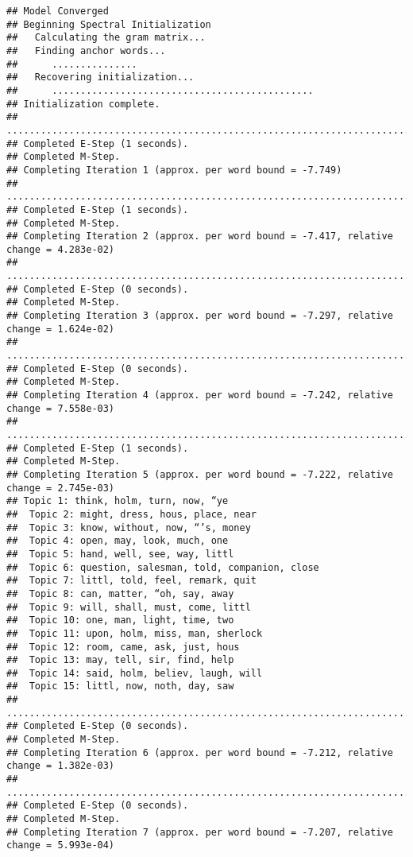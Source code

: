 \documentclass[
]{book}
\begin{document}
\begin{verbatim}
## Model Converged 
## Beginning Spectral Initialization 
##   Calculating the gram matrix...
##   Finding anchor words...
##      ...............
##   Recovering initialization...
##      ..............................................
## Initialization complete.
## ....................................................................................................
## Completed E-Step (1 seconds). 
## Completed M-Step. 
## Completing Iteration 1 (approx. per word bound = -7.749) 
## ....................................................................................................
## Completed E-Step (1 seconds). 
## Completed M-Step. 
## Completing Iteration 2 (approx. per word bound = -7.417, relative change = 4.283e-02) 
## ....................................................................................................
## Completed E-Step (0 seconds). 
## Completed M-Step. 
## Completing Iteration 3 (approx. per word bound = -7.297, relative change = 1.624e-02) 
## ....................................................................................................
## Completed E-Step (0 seconds). 
## Completed M-Step. 
## Completing Iteration 4 (approx. per word bound = -7.242, relative change = 7.558e-03) 
## ....................................................................................................
## Completed E-Step (1 seconds). 
## Completed M-Step. 
## Completing Iteration 5 (approx. per word bound = -7.222, relative change = 2.745e-03) 
## Topic 1: think, holm, turn, now, “ye 
##  Topic 2: might, dress, hous, place, near 
##  Topic 3: know, without, now, “’s, money 
##  Topic 4: open, may, look, much, one 
##  Topic 5: hand, well, see, way, littl 
##  Topic 6: question, salesman, told, companion, close 
##  Topic 7: littl, told, feel, remark, quit 
##  Topic 8: can, matter, “oh, say, away 
##  Topic 9: will, shall, must, come, littl 
##  Topic 10: one, man, light, time, two 
##  Topic 11: upon, holm, miss, man, sherlock 
##  Topic 12: room, came, ask, just, hous 
##  Topic 13: may, tell, sir, find, help 
##  Topic 14: said, holm, believ, laugh, will 
##  Topic 15: littl, now, noth, day, saw 
## ....................................................................................................
## Completed E-Step (0 seconds). 
## Completed M-Step. 
## Completing Iteration 6 (approx. per word bound = -7.212, relative change = 1.382e-03) 
## ....................................................................................................
## Completed E-Step (0 seconds). 
## Completed M-Step. 
## Completing Iteration 7 (approx. per word bound = -7.207, relative change = 5.993e-04) 

\end{verbatim}
\end{document}
